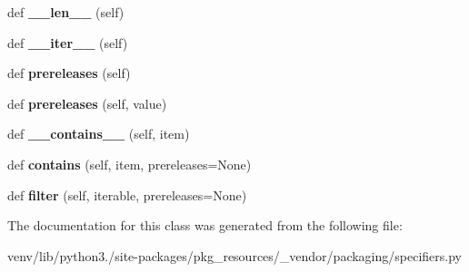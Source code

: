\begin{DoxyCompactItemize}
\mbox{\label{classpkg__resources_1_1__vendor_1_1packaging_1_1specifiers_1_1_specifier_set_af092378544da6b2bb6b00b07a767496d}} 
def {\bfseries \+\_\+\+\_\+len\+\_\+\+\_\+} (self)
\item 
\mbox{\label{classpkg__resources_1_1__vendor_1_1packaging_1_1specifiers_1_1_specifier_set_ae3e1d56ec20225f106bbbb7d4f3ad727}} 
def {\bfseries \+\_\+\+\_\+iter\+\_\+\+\_\+} (self)
\item 
\mbox{\label{classpkg__resources_1_1__vendor_1_1packaging_1_1specifiers_1_1_specifier_set_a8d40983e7e62eac0fba7c36aec5da9ba}} 
def {\bfseries prereleases} (self)
\item 
\mbox{\label{classpkg__resources_1_1__vendor_1_1packaging_1_1specifiers_1_1_specifier_set_ad5f2f43dca1a27acc540f760d112d30f}} 
def {\bfseries prereleases} (self, value)
\item 
\mbox{\label{classpkg__resources_1_1__vendor_1_1packaging_1_1specifiers_1_1_specifier_set_af68a49be1fe37bc12da13ca6ac4b9e49}} 
def {\bfseries \+\_\+\+\_\+contains\+\_\+\+\_\+} (self, item)
\item 
\mbox{\label{classpkg__resources_1_1__vendor_1_1packaging_1_1specifiers_1_1_specifier_set_a666f0adbbfdf76a5747216f3f5255fc9}} 
def {\bfseries contains} (self, item, prereleases=None)
\item 
\mbox{\label{classpkg__resources_1_1__vendor_1_1packaging_1_1specifiers_1_1_specifier_set_a3949d930e10663288d4aab13ba3b0cb0}} 
def {\bfseries filter} (self, iterable, prereleases=None)
\end{DoxyCompactItemize}


The documentation for this class was generated from the following file\+:\begin{DoxyCompactItemize}
\item 
venv/lib/python3./site-\/packages/pkg\+\_\+resources/\+\_\+vendor/packaging/specifiers.\+py\end{DoxyCompactItemize}
